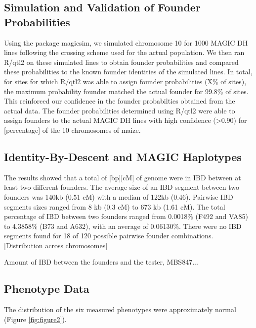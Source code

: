 \documentclass[article,9pt,twocolumn,twoside]{rilabRxiv}
\begin{document}
\subsection{Simulation and Validation of Founder Probabilities}
Using the package magicsim, we simulated chromosome 10 for 1000 MAGIC DH lines following the crossing scheme used for the actual population. We then ran R/qtl2 on these simulated lines to obtain founder probabilities and compared these probabilities to the known founder identities of the simulated lines. In total, for sites for which R/qtl2 was able to assign founder probabilities (X\% of sites), the maximum probability founder matched the actual founder for 99.8\% of sites. This reinforced our confidence in the founder probabilties obtained from the actual data.
The founder probabilities determined using R/qtl2 were able to assign founders to the actual MAGIC DH lines with high confidence (>0.90) for [percentage] of the 10 chromosomes of maize.

\subsection{Identity-By-Descent and MAGIC Haplotypes}
The results showed that a total of [bp][cM] of genome were in IBD between at
least two different founders. The average size of an IBD segment between two founders was 140kb (0.51 cM) with a median of 122kb (0.46). Pairwise IBD segments sizes ranged from 8 kb (0.3 cM) to  673 kb (1.61 cM). The total percentage of IBD between two founders ranged from 0.0018\% (F492 and VA85) to 4.3858\% (B73 and A632), with an average of 0.06130\%. There were no IBD segments found for 18 of 120 possible pairwise founder combinations.  [Distribution across chromosomes]

Amount of IBD between the founders and the tester, MBS847...


\subsection{Phenotype Data}
The distribution of the six measured phenotypes were approximately normal (Figure \ref{fig:figure2}).
\end{document}
